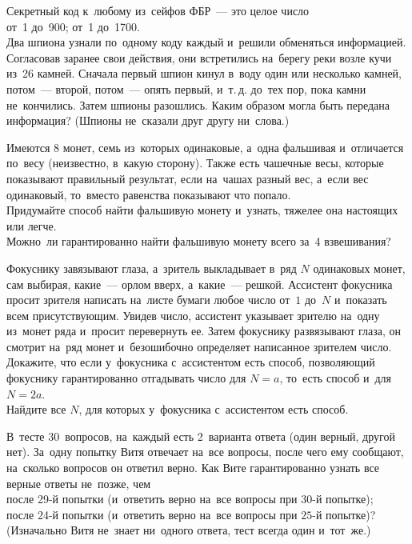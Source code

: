 \begin{problems}
\item
Секретный код к~любому из~сейфов ФБР~--- это целое число
\\
\subproblem от~1 до~900;
\qquad
\subproblemx{*} от~1 до~1700.
\\
Два шпиона узнали по~одному коду каждый и~решили обменяться информацией.
Согласовав заранее свои действия, они встретились на~берегу реки возле кучи
из~26 камней.
Сначала первый шпион кинул в~воду один или несколько камней, потом~--- второй,
потом~--- опять первый, и~т.\,д. до~тех пор, пока камни не~кончились.
Затем шпионы разошлись.
Каким образом могла быть передана информация?
(Шпионы не~сказали друг другу ни~слова.)

\item
Имеются 8 монет, семь из~которых одинаковые, а~одна фальшивая и~отличается
по~весу (неизвестно, в~какую сторону).
Также есть чашечные весы, которые показывают правильный результат, если
на~чашах разный вес, а~если вес одинаковый, то~вместо равенства показывают что
попало.
\\
\subproblem
Придумайте способ найти фальшивую монету и~узнать, тяжелее она настоящих или
легче.
\\
\subproblem
Можно~ли гарантированно найти фальшивую монету всего за~4 взвешивания?

\item
Фокуснику завязывают глаза, а~зритель выкладывает в~ряд $N$ одинаковых монет,
сам выбирая, какие~--- орлом вверх, а~какие~--- решкой.
Ассистент фокусника просит зрителя написать на~листе бумаги любое число от~$1$
до~$N$ и~показать всем присутствующим.
Увидев число, ассистент
указывает зрителю на~одну из~монет ряда и~просит
перевернуть ее.
Затем фокуснику развязывают глаза, он смотрит на~ряд монет и~безошибочно
определяет написанное зрителем число.
\\
\subproblem
Докажите, что если у~фокусника с~ассистентом есть способ, позволяющий фокуснику
гарантированно отгадывать число для $N = a$, то~есть способ и~для $N = 2 a$.
\\
\subproblem
Найдите все $N$, для которых у~фокусника с~ассистентом есть способ.

\item
В~тесте 30~вопросов, на~каждый есть 2~варианта ответа
(один верный, другой нет).
За~одну попытку Витя отвечает на~все вопросы, после чего ему сообщают,
на~сколько вопросов он ответил верно.
Как Вите гарантированно узнать все верные ответы не~позже, чем
\\
\subproblem
после 29-й попытки (и~ответить верно на~все вопросы при $30$-й попытке);
\\
\subproblem
после 24-й попытки (и~ответить верно на~все вопросы при $25$-й попытке)?
\\
(Изначально Витя не~знает ни~одного ответа, тест всегда один и~тот~же.)


\end{problems}
